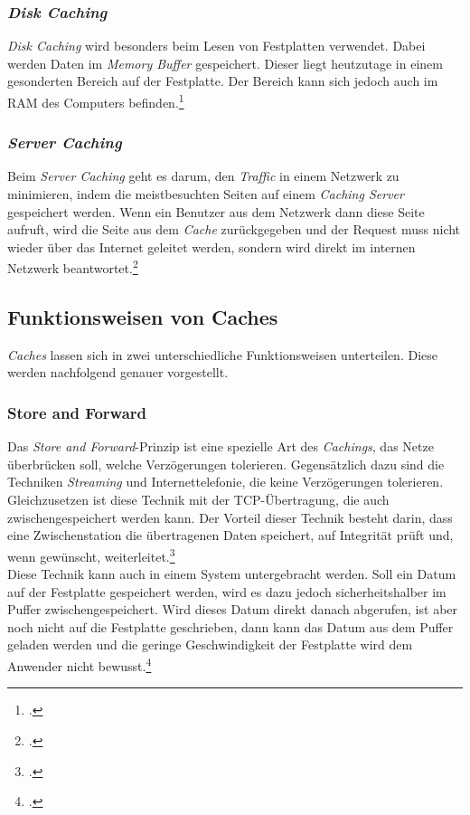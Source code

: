 \subsubsection*{\textit{Disk Caching}}
\textit{Disk Caching} wird besonders beim Lesen von Festplatten verwendet. Dabei werden Daten im \textit{Memory Buffer} gespeichert. Dieser liegt heutzutage in einem gesonderten Bereich auf der Festplatte. Der Bereich kann sich jedoch auch im \ac{RAM} des Computers befinden.\footcite{Cache-Techtarget-DiskCache}
\subsubsection*{\textit{Server Caching}}
Beim \textit{Server Caching} geht es darum, den \textit{Traffic} in einem Netzwerk zu minimieren, indem die meistbesuchten Seiten auf einem \textit{Caching Server} gespeichert werden. Wenn ein Benutzer aus dem Netzwerk dann diese Seite aufruft, wird die Seite aus dem \textit{Cache} zurückgegeben und der Request muss nicht wieder über das Internet geleitet werden, sondern wird direkt im internen Netzwerk beantwortet.\footcite{Cache-ProxyCache}
\subsection{Funktionsweisen von Caches}
\label{ssec:cache-funktionsweisen}
\textit{Caches} lassen sich in zwei unterschiedliche Funktionsweisen unterteilen. Diese werden nachfolgend genauer vorgestellt.
\subsubsection*{Store and Forward}
\label{sssec:cache-store-forward}
Das \textit{Store and Forward}-Prinzip ist eine spezielle Art des \textit{Cachings}, das Netze überbrücken soll, welche Verzögerungen tolerieren. Gegensätzlich dazu sind die Techniken \textit{Streaming} und Internettelefonie, die keine Verzögerungen tolerieren. Gleichzusetzen ist diese Technik mit der \ac{TCP}-Übertragung, die auch zwischengespeichert werden kann. Der Vorteil dieser Technik besteht darin, dass eine Zwischenstation die übertragenen Daten speichert, auf Integrität prüft und, wenn gewünscht, weiterleitet.\footcite{Cache-StoreForward}\\
Diese Technik kann auch in einem System untergebracht werden. Soll ein Datum auf der Festplatte gespeichert werden, wird es dazu jedoch sicherheitshalber im Puffer zwischengespeichert. Wird dieses Datum direkt danach abgerufen, ist aber noch nicht auf die Festplatte geschrieben, dann kann das Datum aus dem Puffer geladen werden und die geringe Geschwindigkeit der Festplatte wird dem Anwender nicht bewusst.\footcite{Cache-StoreForwardSOA}
